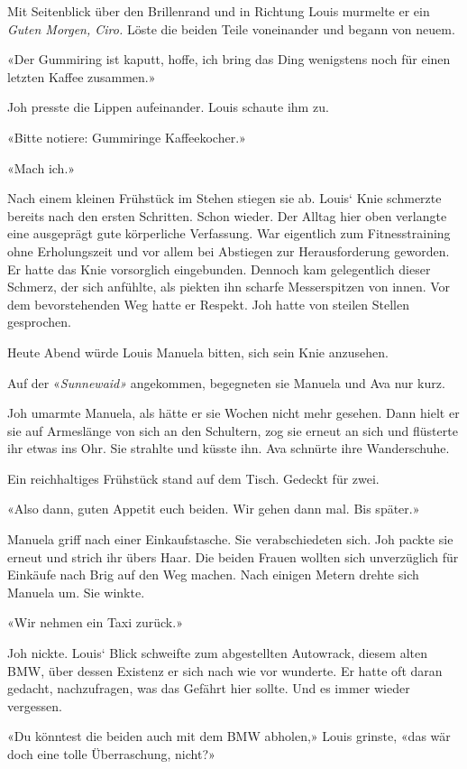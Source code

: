 Mit Seitenblick über den Brillenrand und in Richtung Louis murmelte er
ein \emph{Guten Morgen, Ciro.} Löste die beiden Teile voneinander und
begann von neuem.

«Der Gummiring ist kaputt, hoffe, ich bring das Ding wenigstens noch für
einen letzten Kaffee zusammen.»

Joh presste die Lippen aufeinander. Louis schaute ihm zu.

«Bitte notiere: Gummiringe Kaffeekocher.»

«Mach ich.»

Nach einem kleinen Frühstück im Stehen stiegen sie ab. Louis` Knie
schmerzte bereits nach den ersten Schritten. Schon wieder. Der Alltag
hier oben verlangte eine ausgeprägt gute körperliche Verfassung. War
eigentlich zum Fitnesstraining ohne Erholungszeit und vor allem bei
Abstiegen zur Herausforderung geworden. Er hatte das Knie vorsorglich
eingebunden. Dennoch kam gelegentlich dieser Schmerz, der sich anfühlte,
als piekten ihn scharfe Messerspitzen von innen. Vor dem bevorstehenden
Weg hatte er Respekt. Joh hatte von steilen Stellen gesprochen.

Heute Abend würde Louis Manuela bitten, sich sein Knie anzusehen.

Auf der «\emph{Sunnewaid»} angekommen, begegneten sie Manuela und Ava
nur kurz.

Joh umarmte Manuela, als hätte er sie Wochen nicht mehr gesehen. Dann
hielt er sie auf Armeslänge von sich an den Schultern, zog sie erneut an
sich und flüsterte ihr etwas ins Ohr. Sie strahlte und küsste ihn. Ava
schnürte ihre Wanderschuhe.

Ein reichhaltiges Frühstück stand auf dem Tisch. Gedeckt für zwei.

«Also dann, guten Appetit euch beiden. Wir gehen dann mal. Bis später.»

Manuela griff nach einer Einkaufstasche. Sie verabschiedeten sich. Joh
packte sie erneut und strich ihr übers Haar. Die beiden Frauen wollten
sich unverzüglich für Einkäufe nach Brig auf den Weg machen. Nach
einigen Metern drehte sich Manuela um. Sie winkte.

«Wir nehmen ein Taxi zurück.»

Joh nickte. Louis` Blick schweifte zum abgestellten Autowrack, diesem
alten BMW, über dessen Existenz er sich nach wie vor wunderte. Er hatte
oft daran gedacht, nachzufragen, was das Gefährt hier sollte. Und es
immer wieder vergessen.

«Du könntest die beiden auch mit dem BMW abholen,» Louis grinste, «das
wär doch eine tolle Überraschung, nicht?»

